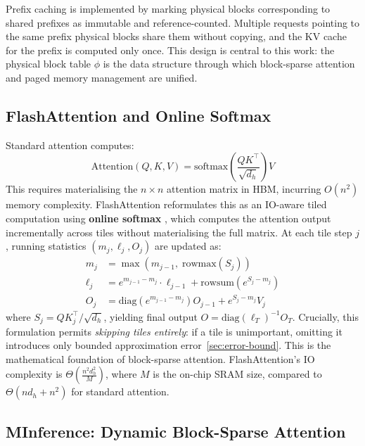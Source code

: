 \documentclass{article}
\begin{document}
Prefix caching is implemented by marking physical blocks corresponding to
shared prefixes as immutable and reference-counted. Multiple requests
pointing to the same prefix physical blocks share them without copying,
and the KV cache for the prefix is computed only once. This design is
central to this work: the physical block table $\phi$ is the data structure
through which block-sparse attention and paged memory management are unified.

\subsection{FlashAttention and Online Softmax}

Standard attention \cite{vaswani2023attentionneed} computes:
%
\begin{equation}
  \text{Attention}(Q, K, V) = \text{softmax}\!\left(
    \frac{QK^\top}{\sqrt{d_h}}\right) V
  \label{eq:attention}
\end{equation}
%
This requires materialising the $n \times n$ attention matrix in HBM,
incurring $O(n^2)$ memory complexity. FlashAttention
\cite{flashattention,flashattention2} reformulates this as an IO-aware
tiled computation using \textbf{online softmax} \cite{milakov2018onlinenormalizercalculationsoftmax},
which computes the attention output incrementally across tiles without
materialising the full matrix. At each tile step $j$, running statistics
$(m_j, \ell_j, O_j)$ are updated as:
%
\begin{align}
  m_j      &= \max\!\left(m_{j-1},\; \text{rowmax}(S_j)\right)
    \label{eq:online-m} \\
  \ell_j   &= e^{m_{j-1} - m_j} \cdot \ell_{j-1}
             + \text{rowsum}\!\left(e^{S_j - m_j}\right)
    \label{eq:online-l} \\
  O_j      &= \text{diag}\!\left(e^{m_{j-1} - m_j}\right) O_{j-1}
             + e^{S_j - m_j} V_j
    \label{eq:online-o}
\end{align}
%
where $S_j = Q K_j^\top / \sqrt{d_h}$, yielding final output
$O = \text{diag}(\ell_T)^{-1} O_T$.
Crucially, this formulation permits \textit{skipping tiles entirely}:
if a tile is unimportant, omitting it introduces only bounded approximation
error~\ref{sec:error-bound}. This is the mathematical foundation of block-sparse attention.
FlashAttention's IO complexity is $\Theta\!\left(\frac{n^2 d_h^2}{M}\right)$,
where $M$ is the on-chip SRAM size, compared to $\Theta(nd_h + n^2)$ for
standard attention.

\subsection{MInference: Dynamic Block-Sparse Attention}
\end{document}
